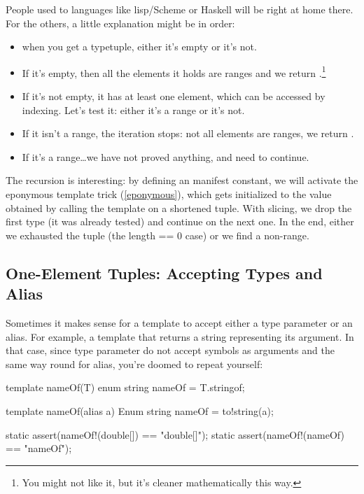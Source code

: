 People used to languages like lisp/Scheme or Haskell will be right at home there. For the others, a little explanation might be in order: 

\begin{itemize}
\item when you get a typetuple, either it's empty or it's not. 
	\item If it's empty, then all the elements it holds are ranges and we return .\footnote{ You might not like it, but it's cleaner mathematically this way.} 
	\item If it's not empty, it has at least one element, which can be accessed by indexing. Let's test it: either it's a range or it's not. 
		\item If it isn't a range, the iteration stops: not all elements are ranges, we return . 
		\item If it's a range\ldots we have not proved anything, and need to continue.
\end{itemize}

The recursion is interesting: by defining an  manifest constant, we will activate the eponymous template trick (\ref{eponymous}), which gets initialized to the value obtained by calling the template on a shortened tuple. With slicing, we drop the first type (it was already tested) and continue on the next one. In the end, either we exhausted the tuple (the length == 0 case) or we find a non-range.


\subsection{One-Element Tuples: Accepting Types and Alias}

Sometimes it makes sense for a template to accept either a type parameter or an alias. For example, a template that returns a string representing its argument. In that case, since type parameter do not accept symbols as arguments and the same way round for alias, you're doomed to repeat yourself:

\begin{dcode}
template nameOf(T)
{
    enum string nameOf = T.stringof;
}

template nameOf(alias a)
{
    Enum string nameOf = to!string(a);
}

static assert(nameOf!(double[]) == "double[]");
static assert(nameOf!(nameOf) == "nameOf");
\end{dcode}

